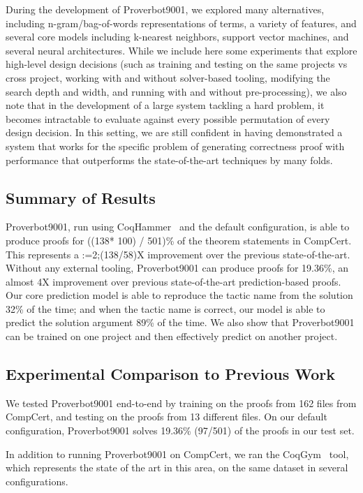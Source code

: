 \documentclass[sigplan,screen]{acmart}
\newcommand{\name}{Proverbot9001\xspace}
\newcommand{\PH}{138}
\newcommand{\PHPercent}{\number\numexpr((\PH * 100) / 501)\relax\%\xspace}
\renewcommand{\>}{\quad}
\begin{document}
During the development of \name{}, we explored many alternatives,
including n-gram/bag-of-words representations of terms, a variety of features,
and several core models including k-nearest neighbors, support vector machines,
and several neural architectures. While we include here some experiments that
explore high-level design decisions (such as training and testing on the same
projects vs cross project, working with and without solver-based tooling,
modifying the search depth and width, and running with and without
pre-processing), we also note that in the development of a large system tackling
a hard problem, it becomes intractable to evaluate against every possible
permutation of every design decision. In this setting, we are still confident in
having demonstrated a system that works for the specific problem of generating
correctness proof with performance that outperforms the state-of-the-art
techniques by many folds.


\subsection{Summary of Results}

\name{}, run using CoqHammer~\cite{coqhammer} and the default configuration,
  is able to produce proofs for \PHPercent of
  the theorem statements in CompCert.
This represents a \xintDigits:=2;\xintthefloatexpr(\PH/58)\relax X improvement
  over the previous state-of-the-art.
Without any external tooling, \name{} can produce proofs for 19.36\%,
  an almost 4X improvement over previous state-of-the-art prediction-based proofs.
Our core prediction model is able to reproduce the tactic name from the solution
  32\% of the time;
  and when the tactic name is correct,
  our model is able to predict the solution argument 89\% of the time.
We also show that Proverbot9001 can be trained on one project
  and then effectively predict on another project.

\subsection{Experimental Comparison to Previous Work}
\label{ssec:coqgym-comparison}

We tested \name{} end-to-end by training on the proofs from 162 files from CompCert,
  and testing on the proofs from 13 different files.
On our default configuration,
  \name{} solves 19.36\% (97/501) of the proofs in our test set.

In addition to running \name{} on CompCert,
  we ran the CoqGym~\cite{coqgym} tool,
  which represents the state of the art in this area,
  on the same dataset in several configurations.
\end{document}
